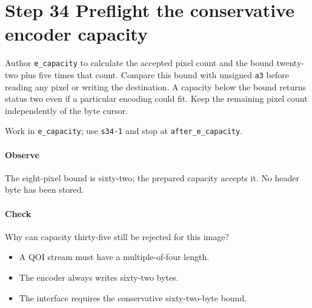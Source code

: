 \section{Step 34 Preflight the conservative encoder capacity}\label{qoi-s34}
Author \texttt{e\_capacity} to calculate the accepted pixel count and the bound twenty-two plus five times that count. Compare this bound with unsigned \texttt{a3} before reading any pixel or writing the destination. A capacity below the bound returns status two even if a particular encoding could fit. Keep the remaining pixel count independently of the byte cursor.

Work in \texttt{e\_capacity}; use \texttt{s34-1} and stop at \texttt{after\_e\_capacity}.

\paragraph{Observe} The eight-pixel bound is sixty-two; the prepared capacity accepts it. No header byte has been stored.

\paragraph{Check} Why can capacity thirty-five still be rejected for this image?
\begin{itemize}
  \item[A.] A QOI stream must have a multiple-of-four length.
  \item[B.] The encoder always writes sixty-two bytes.
  \item[C.] The interface requires the conservative sixty-two-byte bound.
\end{itemize}

